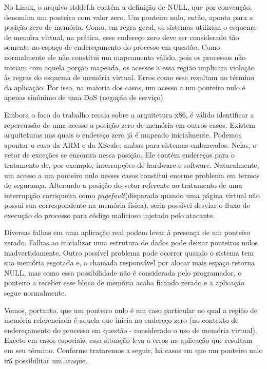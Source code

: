 		No Linux, o arquivo stddef.h contém a definição de NULL, que por
		convenção, denomina um ponteiro com valor zero.
		Um ponteiro nulo, então, aponta para a posição zero de memória. 
		Como, em regra geral, os sistemas utilizam o esquema de memóra virtual,
		na prática, esse endereço zero deve ser considerado tão somente no espaço
		de endereçamento do processo em questão.
		Como normalmente ele não constitui um mapeamento válido, pois os processos não
		iniciam com aquela porção mapeada, os acessos a essa região implicam violação
		às regras do esquema de memória virtual. Erros como esse resultam
		no término da aplicação. Por isso, na maioria dos casos, um acesso a um ponteiro
		nulo é apenas sinônimo de uma DoS (negação de serviço).


		Embora o foco do trabalho recaia sobre a arquitetura x86, é válido identificar a repercussão
		de uma acesso a posição zero de memória em outros casos.
		Existem arquiteturas nas quais o endereço zero já é mapeado inicialmente. 
		Podemos apontar o caso da ARM e da XScale; ambas para sistemas embarcados. 
		Nelas, o vetor de exceções se encontra nessa posição. Ele contém
		endereços para o tratamento de, por exemplo, interrupções de hardware e software.
		Naturalmente, um acesso a um ponteiro nulo nesses casos constitui enorme
		problema em termos de segurança. Alterando a posição do vetor referente ao tratamento
		de uma interrupção corriqueira como \textsl{pagefault}(disparada quando uma página
		virtual não possui sua correspondente na memória física), seria possível desviar o fluxo
		de execução do processo para código malicioso injetado pelo atacante.

		
		Diversas falhas em uma aplicação real podem levar à presença de um ponteiro zerado.
		Falhas ao inicializar uma estrutura de dados pode deixar ponteiros nulos inadvertidamente.
		Outro possível problema pode ocorrer quando o sistema tem sua memória esgotada e, 
		a chamada responsável por alocar mais espaço retorna NULL, mas como essa possibilidade não é considerada
		pelo programador, o ponteiro a receber esse bloco de memória acaba ficando zerado e a aplicação
		segue normalmente.
		
		Vemos, portanto, que um ponteiro nulo é um caso particular no qual a região de memória
		referenciada é aquela que inicia no endereço zero (no contexto de endereçamento do
		processo em questão - considerado o uso de memória virtual). 
		Exceto em casos especiais, essa situação leva a erros na aplicação que resultam em seu término.
		Conforme trataremos a seguir, há casos em que um ponteiro nulo irá possibilitar um ataque.		

